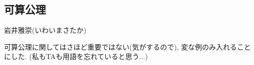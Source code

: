\documentclass[dvipdfmx,a4paper,11pt]{article}
\newcommand{\R}{\mathbb{R}}
\theoremstyle{definition}
\begin{document}
\begin{enumerate}[label=\textbf{問}\ref*{sec-Hausdorff}.\arabic*]


	
 \end{enumerate}
 

\newpage


\begin{center}
\section{可算公理}
\label{sec-countable}
\end{center}

\begin{flushright}
 岩井雅崇(いわいまさたか)
\end{flushright}

可算公理に関してはさほど重要ではない(気がするので), 変な例のみ入れることにした. (私もTAも用語を忘れていると思う...)
\end{document}
